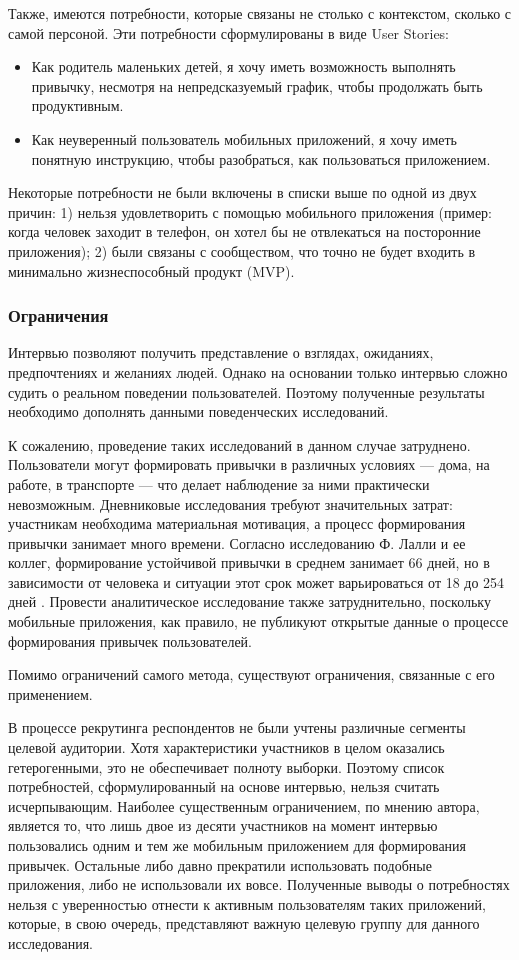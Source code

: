 \documentclass[pdflatex,sn-mathphys-num]{sn-jnl}%
\theoremstyle{thmstyleone}%
\theoremstyle{thmstyletwo}%
\theoremstyle{thmstylethree}%
\begin{document}
Также, имеются потребности, которые связаны не столько с контекстом, сколько с самой персоной. Эти потребности сформулированы в виде User Stories:

\begin{itemize}
    \item Как родитель маленьких детей, я хочу иметь возможность выполнять привычку, несмотря на непредсказуемый график, чтобы продолжать быть продуктивным.
    \item Как неуверенный пользователь мобильных приложений, я хочу иметь понятную инструкцию, чтобы разобраться, как пользоваться приложением.
\end{itemize}

Некоторые потребности не были включены в списки выше по одной из двух причин: 1) нельзя удовлетворить с помощью мобильного приложения (пример: когда человек заходит в телефон, он хотел бы не отвлекаться на посторонние приложения); 2) были связаны с сообществом, что точно не будет входить в минимально жизнеспособный продукт (MVP). 

\subsubsection{Ограничения}

Интервью позволяют получить представление о взглядах, ожиданиях, предпочтениях и желаниях людей. Однако на основании только интервью сложно судить о реальном поведении пользователей. Поэтому полученные результаты необходимо дополнять данными поведенческих исследований.

К сожалению, проведение таких исследований в данном случае затруднено. Пользователи могут формировать привычки в различных условиях — дома, на работе, в транспорте — что делает наблюдение за ними практически невозможным. Дневниковые исследования требуют значительных затрат: участникам необходима материальная мотивация, а процесс формирования привычки занимает много времени. Согласно исследованию Ф. Лалли и ее коллег, формирование устойчивой привычки в среднем занимает 66 дней, но в зависимости от человека и ситуации этот срок может варьироваться от 18 до 254 дней \cite{lally_how_2010}. Провести аналитическое исследование также затруднительно, поскольку мобильные приложения, как правило, не публикуют открытые данные о процессе формирования привычек пользователей.

Помимо ограничений самого метода, существуют ограничения, связанные с его применением.

В процессе рекрутинга респондентов не были учтены различные сегменты целевой аудитории. Хотя характеристики участников в целом оказались гетерогенными, это не обеспечивает полноту выборки. Поэтому список потребностей, сформулированный на основе интервью, нельзя считать исчерпывающим. Наиболее существенным ограничением, по мнению автора, является то, что лишь двое из десяти участников на момент интервью пользовались одним и тем же мобильным приложением для формирования привычек. Остальные либо давно прекратили использовать подобные приложения, либо не использовали их вовсе. Полученные выводы о потребностях нельзя с уверенностью отнести к активным пользователям таких приложений, которые, в свою очередь, представляют важную целевую группу для данного исследования.
\end{document}
